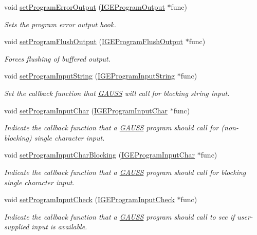 \begin{DoxyCompactItemize}
void \hyperlink{class_g_a_u_s_s_abd75266b2c4075da75163fe95b013ef3}{set\-Program\-Error\-Output} (\hyperlink{class_i_g_e_program_output}{I\-G\-E\-Program\-Output} $\ast$func)
\begin{DoxyCompactList}\small\item\em Sets the program error output hook. \end{DoxyCompactList}\item 
void \hyperlink{class_g_a_u_s_s_a4b7ecb768f49b98110729db7e5728296}{set\-Program\-Flush\-Output} (\hyperlink{class_i_g_e_program_flush_output}{I\-G\-E\-Program\-Flush\-Output} $\ast$func)
\begin{DoxyCompactList}\small\item\em Forces flushing of buffered output. \end{DoxyCompactList}\item 
void \hyperlink{class_g_a_u_s_s_ae82b5bfdf26971433c46936a812506c3}{set\-Program\-Input\-String} (\hyperlink{class_i_g_e_program_input_string}{I\-G\-E\-Program\-Input\-String} $\ast$func)
\begin{DoxyCompactList}\small\item\em Set the callback function that \hyperlink{class_g_a_u_s_s}{G\-A\-U\-S\-S} will call for blocking string input. \end{DoxyCompactList}\item 
void \hyperlink{class_g_a_u_s_s_a71a60afb143ae00b18d6fe3fd99f316d}{set\-Program\-Input\-Char} (\hyperlink{class_i_g_e_program_input_char}{I\-G\-E\-Program\-Input\-Char} $\ast$func)
\begin{DoxyCompactList}\small\item\em Indicate the callback function that a \hyperlink{class_g_a_u_s_s}{G\-A\-U\-S\-S} program should call for (non-\/blocking) single character input. \end{DoxyCompactList}\item 
void \hyperlink{class_g_a_u_s_s_a300d6e33dbfd2a45f56ff2769f585435}{set\-Program\-Input\-Char\-Blocking} (\hyperlink{class_i_g_e_program_input_char}{I\-G\-E\-Program\-Input\-Char} $\ast$func)
\begin{DoxyCompactList}\small\item\em Indicate the callback function that a \hyperlink{class_g_a_u_s_s}{G\-A\-U\-S\-S} program should call for blocking single character input. \end{DoxyCompactList}\item 
void \hyperlink{class_g_a_u_s_s_a6517b404cf71d157808a1cb73e3c0ddb}{set\-Program\-Input\-Check} (\hyperlink{class_i_g_e_program_input_check}{I\-G\-E\-Program\-Input\-Check} $\ast$func)
\begin{DoxyCompactList}\small\item\em Indicate the callback function that a \hyperlink{class_g_a_u_s_s}{G\-A\-U\-S\-S} program should call to see if user-\/supplied input is available. \end{DoxyCompactList}\end{DoxyCompactItemize}
